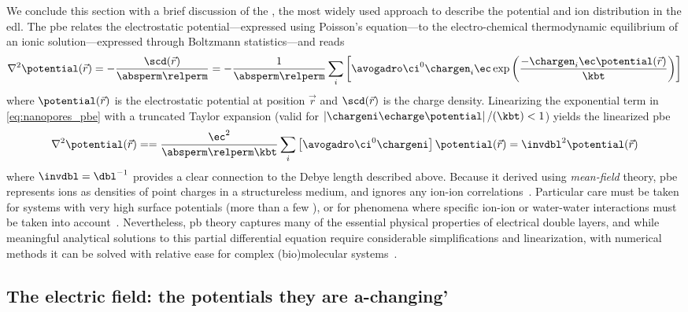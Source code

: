 We conclude this section with a brief discussion of the , the most widely used approach to
describe the potential and ion distribution in the \gls{edl}. The \gls{pbe} relates the electrostatic
potential---expressed using Poisson's equation---to the electro-chemical thermodynamic equilibrium of an ionic
solution---expressed through Boltzmann statistics---and reads~\cite{Gouy-1910,Chapman-1913,Baker-2005}
%
\begin{equation}\label{eq:nanopores_pbe}
  \nabla^2 \potential(\vec{r}) = - \dfrac{\scd(\vec{r})}{\absperm \relperm}
  = - \dfrac{1}{\absperm \relperm}
  \sum_i \left[ \avogadro \ci^0 \chargen_i \ec
         \exp \left( \dfrac{-\chargen_i \ec \potential(\vec{r}) }{\kbt} \right)
        \right]
\end{equation}
%
where $\potential(\vec{r})$ is the electrostatic potential at position $\vec{r}$ and $\scd(\vec{r})$ is the
charge density. Linearizing the exponential term in \cref{eq:nanopores_pbe} with a truncated Taylor expansion
(valid for $\left| \chargeni \echarge \potential \right| / (\kbt) < 1$) yields the linearized \gls{pbe}
%
\begin{equation}\label{eq:nanopores_pbe_linear}
  \nabla^2 \potential(\vec{r}) = 
  = \dfrac{\ec^2}{\absperm \relperm \kbt} \sum_i \left[ \avogadro \ci^0 \chargeni \right]
      \potential(\vec{r})
  = \invdbl^2 \potential(\vec{r})
\end{equation}
%
where $\invdbl = \dbl^{-1}$ provides a clear connection to the Debye length described above. Because it
derived using \emph{mean-field} theory, \gls{pbe} represents ions as densities of point charges in a
structureless medium, and ignores any ion-ion correlations~\cite{Bocquet-2010}. Particular care must be taken
for systems with very high surface potentials (more than a few \si{\kTe}), or for phenomena where specific
ion-ion or water-water interactions must be taken into account~\cite{Collins-2012}. Nevertheless, \gls{pb}
theory captures many of the essential physical properties of electrical double layers, and while meaningful
analytical solutions to this partial differential equation require considerable simplifications and
linearization, with numerical methods it can be solved with relative ease for complex (bio)molecular
systems~\cite{Baker-2001,Baker-2005}.


\subsection{The electric field: the potentials they are a-changing'}
%

